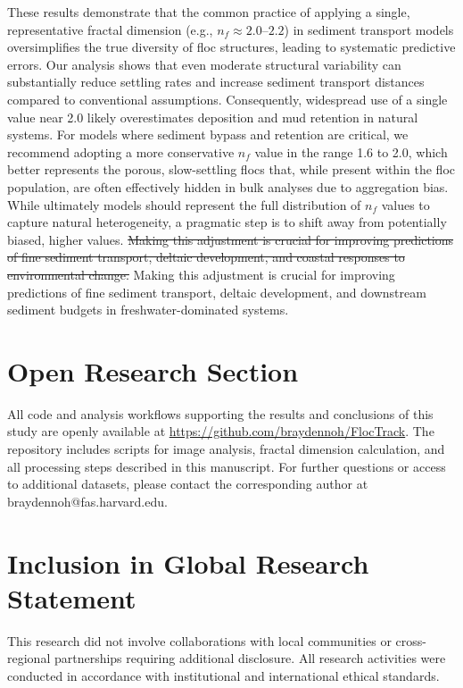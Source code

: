 \documentclass{agujournal2019}
\providecommand{\DIFadd}[1]{{\protect\color{blue}#1}}
\providecommand{\DIFdel}[1]{{\protect\color{red}\sout{#1}}}
\begin{document}
These results demonstrate that the common practice of applying a single, representative fractal dimension (e.g., \( n_f \approx 2.0\text{--}2.2 \)) in sediment transport models oversimplifies the true diversity of floc structures, leading to systematic predictive errors. Our analysis shows that even moderate structural variability can substantially reduce settling rates and increase sediment transport distances compared to conventional assumptions. Consequently, widespread use of a single value near 2.0 likely overestimates deposition and mud retention in natural systems. For models where sediment bypass and retention are critical, we recommend adopting a more conservative \( n_f \) value in the range 1.6 to 2.0, which better represents the porous, slow-settling flocs that, while present within the floc population, are often effectively hidden in bulk analyses due to aggregation bias. While ultimately models should represent the full distribution of \( n_f \) values to capture natural heterogeneity, a pragmatic step is to shift away from potentially biased, higher values. \DIFdel{Making this adjustment is crucial for improving predictions of fine sediment transport, deltaic development, and coastal responses to environmental change.} \DIFadd{Making this adjustment is crucial for improving predictions of fine sediment transport, deltaic development, and downstream sediment budgets in freshwater-dominated systems.}

\section*{Open Research Section}
All code and analysis workflows supporting the results and conclusions of this study are openly available at \url{https://github.com/braydennoh/FlocTrack}. The repository includes scripts for image analysis, fractal dimension calculation, and all processing steps described in this manuscript. For further questions or access to additional datasets, please contact the corresponding author at braydennoh@fas.harvard.edu.

\section*{Inclusion in Global Research Statement}
This research did not involve collaborations with local communities or cross-regional partnerships requiring additional disclosure. All research activities were conducted in accordance with institutional and international ethical standards.
\end{document}
